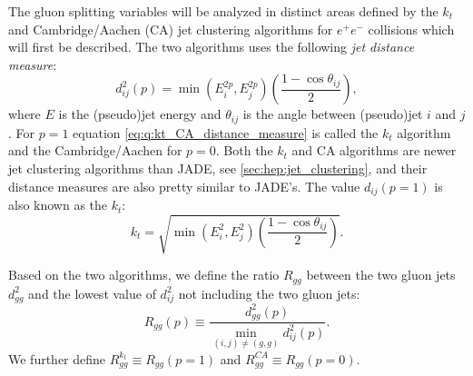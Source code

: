 \begin{enumerate}[leftmargin=*,labelindent=40pt]
\end{enumerate}

The gluon splitting variables will be analyzed in distinct areas defined by the $k_t$ \citep{cataniLongitudinallyinvariantKtclusteringAlgorithms1993,ellisSuccessiveCombinationJet1993} and Cambridge/Aachen (CA) \citep{dokshitzerBetterJetClustering1997,wobischHadronizationCorrectionsJet1999} jet clustering algorithms for $e^+e^-$ collisions which will first be described. The two algorithms uses the following \emph{jet distance measure}:
\begin{equation}
  \label{eq:q:kt_CA_distance_measure}
  d_{ij}^2(p) = \min \left(E_i^{2p}, E_j^{2p} \right) \left(\frac{1-\cos \theta_{ij}}{2} \right), 
\end{equation}
where $E$ is the (pseudo)jet energy and $\theta_{ij}$ is the angle between (pseudo)jet $i$ and $j$ \autocite{cacciariFastJetUserManual2012}. For $p=1$ equation \eqref{eq:q:kt_CA_distance_measure} is called the $k_t$ algorithm and the Cambridge/Aachen for $p=0$. Both the $k_t$ and CA algorithms are newer jet clustering algorithms than JADE, see \autoref{sec:hep:jet_clustering}, and their distance measures are also pretty similar to JADE's. The value $d_{ij}(p=1)$ is also known as the $k_t$:
\begin{equation}
  \label{eq:q:k_t_definition_kt}
  k_t = \sqrt{\min \left(E_i^2, E_j^2 \right) \left(\frac{1-\cos \theta_{ij}}{2} \right)}.
\end{equation}

Based on the two algorithms, we define the ratio $R_{gg}$ between the two gluon jets $d^2_{gg}$ and the lowest value of $d^2_{ij}$ not including the two gluon jets:
\begin{equation}
  R_{gg}(p) \equiv \frac{d^2_{gg}(p)}{\min_{(i,j) \neq (g,g)} d^2_{ij}(p)}.
\end{equation} 
We further define $R_{gg}^{k_t} \equiv R_{gg}(p=1)$ and $R_{gg}^{CA} \equiv R_{gg}(p=0)$. 

